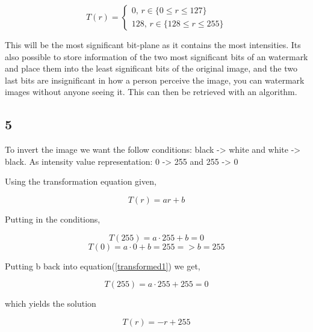 {    \begin{equation}
        T(r) =  \begin{cases} 
            0 ,\, r\in\{0\leq r \leq 127 \} \\
            128 ,\, r\in\{128\leq r \leq 255 \}
         \end{cases}
    \end{equation}
    
    This will be the most significant bit-plane as it contains the most intensities. Its also possible to store information of the two most significant bits of an watermark and place them into the least significant bits of the original image, and the two last bits are insignificant in how a person perceive the image, you can watermark images without anyone seeing it. This can then be retrieved with an algorithm.
    
    
    \subsection{5}
    
    To invert the image we want the follow conditions: black -> white and white -> black.
    As intensity value representation: 0 -> 255 and 255 -> 0
    
    Using the transformation equation given,
    
    \begin{equation*}
        T(r) = ar + b
    \end{equation*}
    
    Putting in the conditions,
    
    \begin{equation}
        T(255) = a\cdot 255 + b = 0
        \label{transformed1}
    \end{equation}
    \begin{equation*}
        T(0) = a\cdot 0 + b = 255 => b = 255
    \end{equation*}
    
    Putting b back into equation(\ref{transformed1}) we get,
    
    \begin{equation*}
        T(255) = a\cdot 255 + 255 = 0
    \end{equation*}
    
    which yields the solution
    
    \begin{equation}
        T(r) = -r + 255
    \end{equation}


}
